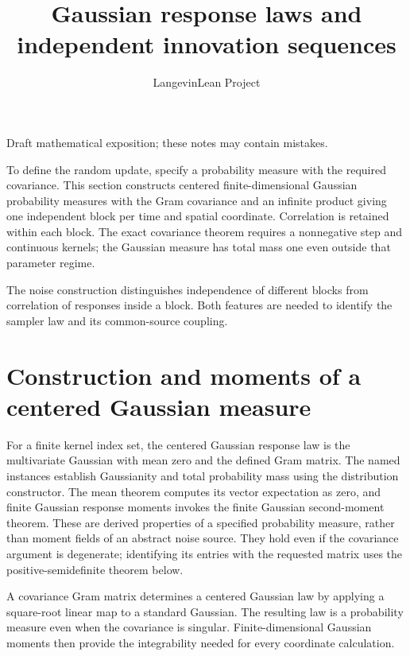\documentclass[11pt,a4paper]{article}
\title{\texorpdfstring{Gaussian response laws and independent innovation sequences}{Gaussian response laws and independent innovation sequences}}
\author{LangevinLean Project}
\date{}
\begin{document}
\maketitle
Draft mathematical exposition; these notes may contain mistakes.


To define the random update, specify a probability measure with the required covariance. This section constructs centered finite-dimensional Gaussian probability measures with the Gram covariance and an infinite product giving one independent block per time and spatial coordinate. Correlation is retained within each block. The exact covariance theorem requires a nonnegative step and continuous kernels; the Gaussian measure has total mass one even outside that parameter regime.



The noise construction distinguishes independence of different blocks from correlation of responses inside a block. Both features are needed to identify the sampler law and its common-source coupling.


\section{\texorpdfstring{Construction and moments of a centered Gaussian measure}{Construction and moments of a centered Gaussian measure}}


For a finite kernel index set, the centered Gaussian response law is the multivariate Gaussian with mean zero and the defined Gram matrix. The named instances establish Gaussianity and total probability mass using the distribution constructor. The mean theorem computes its vector expectation as zero, and finite Gaussian response moments invokes the finite Gaussian second-moment theorem. These are derived properties of a specified probability measure, rather than moment fields of an abstract noise source. They hold even if the covariance argument is degenerate; identifying its entries with the requested matrix uses the positive-semidefinite theorem below.



A covariance Gram matrix determines a centered Gaussian law by applying a square-root linear map to a standard Gaussian. The resulting law is a probability measure even when the covariance is singular. Finite-dimensional Gaussian moments then provide the integrability needed for every coordinate calculation.
\end{document}
